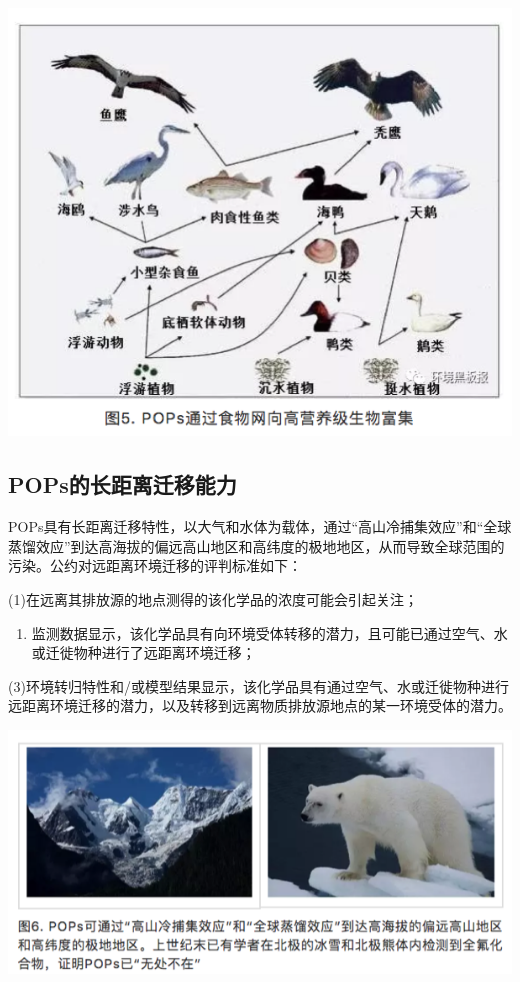 \documentclass[]{book}
\providecommand{\tightlist}{%
  \setlength{\itemsep}{0pt}\setlength{\parskip}{0pt}}
\begin{document}
\includegraphics[width=8.33in]{images/gongyue5}

\hypertarget{popsux7684ux957fux8dddux79bbux8fc1ux79fbux80fdux529b}{%
\subsection{POPs的长距离迁移能力}\label{popsux7684ux957fux8dddux79bbux8fc1ux79fbux80fdux529b}}

POPs具有长距离迁移特性，以大气和水体为载体，通过``高山冷捕集效应''和``全球蒸馏效应''到达高海拔的偏远高山地区和高纬度的极地地区，从而导致全球范围的污染。公约对远距离环境迁移的评判标准如下：

(1)在远离其排放源的地点测得的该化学品的浓度可能会引起关注；

\begin{enumerate}
\def\labelenumi{(\arabic{enumi})}
\setcounter{enumi}{1}
\tightlist
\item
  监测数据显示，该化学品具有向环境受体转移的潜力，且可能已通过空气、水或迁徙物种进行了远距离环境迁移；
\end{enumerate}

(3)环境转归特性和/或模型结果显示，该化学品具有通过空气、水或迁徙物种进行远距离环境迁移的潜力，以及转移到远离物质排放源地点的某一环境受体的潜力。

\includegraphics[width=8.33in]{images/gongyue6}
\end{document}
